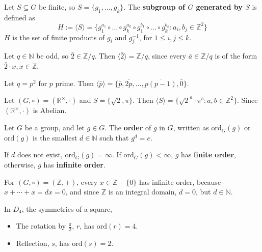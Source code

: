 \begin{definition}
	Let $S \subseteq G$ be finite, so $S = \{ g_1, \dots, g_k \}$. The \textbf{subgroup of $G$ generated by $S$} is defined as
	\[
		H := \langle S \rangle = \{ g_1^{a_1} \circ \dots \circ g_k^{a_k} \circ g_1^{b_1} \circ \dots \circ g_k^{b_k}: a_i, b_j \in \mathbb{Z}^2 \}
	\]
	$H$ is the set of finite products of $g_i$ and $g_j^{-1}$, for $1 \le i, j \le k$.
\end{definition}

\begin{example}
	Let $q \in \mathbb{N}$ be odd, so $\bar{2} \in \mathbb{Z} / q$. Then $\langle \bar{2} \rangle = \mathbb{Z} / q$, since every $\bar{a} \in \mathbb{Z} / q$ is of the form $\bar{2} \cdot x, x \in \mathbb{Z}$.
\end{example}

\begin{example}
	Let $q = p^2$ for $p$ prime. Then $\langle \bar{p} \rangle = \{ \bar{p}, \overline{2p}, \dots, \overline{p(p - 1)}, \bar{0} \}$.
\end{example}

\begin{example}
	Let $(G, \circ) = (\mathbb{R}^{\times}, \cdot)$ and $S = \{ \sqrt{2}, \pi \}$. Then $\langle S \rangle = \{ \sqrt{2}^a \cdot \pi^b: a, b \in \mathbb{Z}^2 \}$. Since $(\mathbb{R}^{\times}, \cdot)$ is Abelian.
\end{example}

\begin{definition}
	Let $G$ be a group, and let $g \in G$. The \textbf{order} of $g$ in $G$, written as $\text{ord}_G (g)$ or $\text{ord}(g)$ is the smallest $d \in \mathbb{N}$ such that $g^d = e$.

	If $d$ does not exist, $\text{ord}_G(g) = \infty$. If $\text{ord}_G(g) < \infty$, $g$ has \textbf{finite order}, otherwise, $g$ has \textbf{infinite order}.
\end{definition}

\begin{example}
	For $(G, \circ) = (\mathbb{Z}, +)$, every $x \in \mathbb{Z} - \{ 0 \}$ has infinite order, because $x + \cdots + x = dx = 0$, and since $\mathbb{Z}$ is an integral domain, $d = 0$, but $d \in \mathbb{N}$.
\end{example}

\begin{example}
	In $D_4$, the symmetries of a square,
	\begin{itemize}
		\item The rotation by $\frac{\pi}{2}$, $r$, has $\text{ord} (r) = 4$.
		\item Reflection, $s$, has $\text{ord}(s) = 2$.
	\end{itemize}
\end{example}

